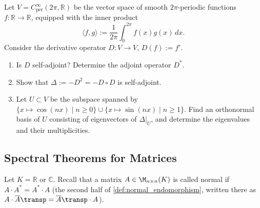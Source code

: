 \begin{exercise}
  \label{exc:differential_operators_fourier}
  Let $V = C^\infty_{\text{per}}(2\pi, \mathbb{R})$ be the vector space of smooth $2\pi$-periodic functions $f \colon \mathbb{R} \to \mathbb{R}$, equipped with the inner product
  \[
  \langle f, g \rangle := \frac{1}{2\pi} \int_0^{2\pi} f(x) g(x) \, dx.
  \]
  Consider the derivative operator $D \colon V \to V$, $D(f) := f'$.
  \begin{enumerate}[label=\textbf{(\alph*)}]
    \item Is $D$ self-adjoint? Determine the adjoint operator $D^*$.
    \item Show that $\Delta := -D^2 = -D \circ D$ is self-adjoint.
    \item Let $U \subset V$ be the subspace spanned by $\{x \mapsto \cos(nx) \mid n \ge 0\} \cup \{x \mapsto \sin(nx) \mid n \ge 1\}$. Find an orthonormal basis of $U$ consisting of eigenvectors of $\Delta|_U$, and determine the eigenvalues and their multiplicities.
  \end{enumerate}
\end{exercise}

\subsection{Spectral Theorems for Matrices}

Let $K = \mathbb{R}$ or $\mathbb{C}$. Recall that a matrix $A \in \M_{n \times n}(K)$ is called normal if $A \cdot A^* = A^* \cdot A$ (the second half of \cref{def:normal_endomorphism}, written there as $A \cdot \overline{A}\transp = \overline{A}\transp \cdot A$).

